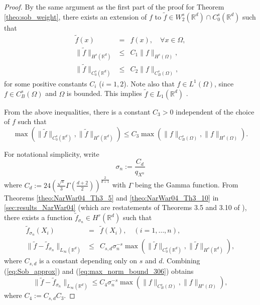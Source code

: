 \documentclass[11pt]{article}
\theoremstyle{remark}
\theoremstyle{example}
\theoremstyle{remark}
\newcommand{\tf}{{\tilde{f}}}
\newcommand{\R}{\mathbb{R}}
\newcommand{\citealp}{\cite}
\begin{document}
\begin{proof}
By the same argument as the first part of the proof for Theorem \ref{theo:sob_weight}, there exists an extension of $f$ to $\tf\in W_2^s(\R^d)\cap C_0^s(\R^d)$ such that
\begin{eqnarray}
\tf(x) &=& f(x), \quad \forall x \in \Omega, \label{eq:extension_identity_268} \\
\| \tf \|_{H^s(\R^d)}  &\leq&  C_1 \| f \|_{H^s(\Omega)}, \label{eq:ext_sobnorm_291} \\
\| \tf \|_{C_0^s(\R^d)} &\leq& C_2 \| f \|_{C_B^s(\Omega)}, \label{eq:norm_extension_282}
\end{eqnarray}
for some positive constants $C_i$ ($i=1,2$). 
Note also that $f\in L^1(\Omega)$, since $f\in C^s_B(\Omega)$ and $\Omega$ is bounded.  This implies $\tf \in L_1(\R^d)$ \cite[p.181]{Ste70}.

From the above inequalities, there is a constant $C_3>0$ independent of the choice of $f$ such that 
\begin{equation}
\max \left( \| \tf \|_{C_0^s(\R^d)}, \| \tf \|_{H^s(\R^d)} \right) 
\leq  C_3  \max \left(  \| f \|_{C_B^s(\Omega)}, \| f \|_{H^s(\Omega)}  \right).  \label{eq:max_norm_bound_306}
\end{equation}

For notational simplicity, write 
\begin{equation}
\sigma_n := \frac{C_d}{q_{X^n}}\label{Eq:sign}
\end{equation}
where $C_d := 24(\frac{\sqrt{\pi}}{3} \Gamma(\frac{d+2}{2}))^{\frac{2}{d+1}}$ with $\Gamma$ being the Gamma function.
From Theorems \ref{theo:NarWar04_Th3_5}
and \ref{theo:NarWar04_Th3_10} in \ref{sec:results_NarWar04} (which are restatements of Theorems 3.5 and 3.10 of \citealp{NarWar04}), there exists a function $\tf_{\sigma_n} \in H^r (\R^d)$ such that
\begin{eqnarray}
 \tf_{\sigma_n}(X_i) &=& \tf(X_i),\quad (i=1,\dots,n), \label{eq:Sob_interp} \\
\| \tf - \tf_{\sigma_n} \|_{L_\infty(\R^d)} &\leq& C_{s,d} \sigma_n^{-s} \max( \| \tf \|_{C_0^s(\R^d)}, \| \tf \|_{H^s(\R^d)}), \label{eq:Sob_approx}
\end{eqnarray}
where $C_{s,d}$ is a constant depending only on $s$ and $d$.
Combining (\ref{eq:Sob_approx}) and (\ref{eq:max_norm_bound_306}) obtains
\begin{equation}
\| \tf - \tf_{\sigma_n} \|_{L_\infty(\R^d)} 
\leq C_4 \sigma_n^{-s}   \max \left(  \| f \|_{C_B^s(\Omega)}, \| f \|_{H^s(\Omega)}  \right), \label{eq:bound_unif_330}
\end{equation}
where $C_4 := C_{s,d} C_3$. 


\end{proof}
\end{document}
